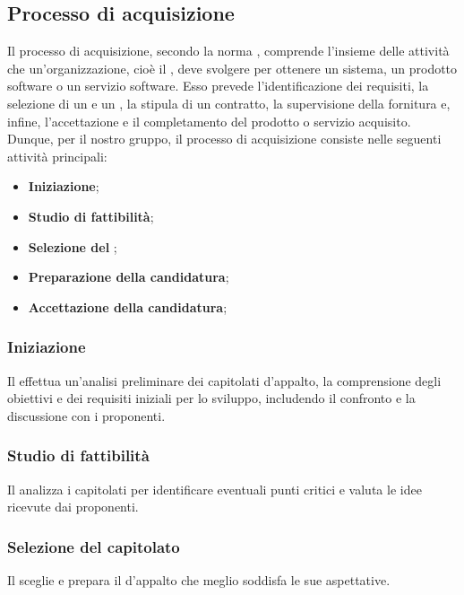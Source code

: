 \subsection{Processo di acquisizione}
\label{subsection:Processo_acquisizione}
Il processo di acquisizione, secondo la norma , comprende l'insieme delle attività che un'organizzazione, cioè il , deve svolgere per ottenere un sistema, un prodotto software o un servizio software. Esso prevede l'identificazione dei requisiti, la selezione di un  e un , la stipula di un contratto, la supervisione della fornitura e, infine, l'accettazione e il completamento del prodotto o servizio acquisito.
Dunque, per il nostro gruppo, il processo di acquisizione consiste nelle seguenti attività principali:

\begin{itemize}
    \item \textbf{Iniziazione}; 
    \item \textbf{Studio di fattibilità}; 
    \item \textbf{Selezione del }; 
    \item \textbf{Preparazione della candidatura}; 
    \item \textbf{Accettazione della candidatura}; 
\end{itemize}

\subsubsection{Iniziazione}
Il  effettua un'analisi preliminare dei capitolati d’appalto, la comprensione degli obiettivi e dei requisiti iniziali per lo sviluppo, includendo il confronto e la discussione con i proponenti.

\subsubsection{Studio di fattibilità}
Il  analizza i capitolati per identificare eventuali punti critici e valuta le idee ricevute dai proponenti.

\subsubsection{Selezione del capitolato}
Il  sceglie e prepara il  d'appalto che meglio soddisfa le sue aspettative.

